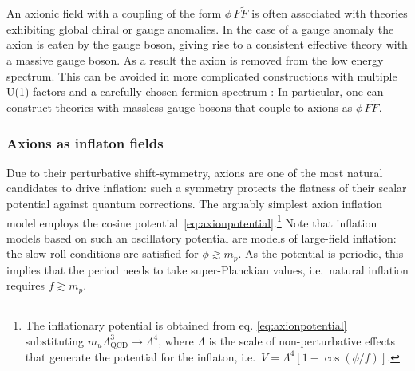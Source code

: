 An axionic field with a coupling of the form $\phi \, F \tilde F$ is often associated with theories exhibiting global chiral or gauge anomalies. In the case of a gauge anomaly the axion is eaten by the gauge boson, giving rise to a consistent effective theory with a massive gauge boson. As a result the axion is removed from the low energy spectrum. This can be avoided in more complicated constructions with multiple U(1) factors and a carefully chosen fermion spectrum \cite{0605225}: In particular, one can construct theories with massless gauge bosons that couple to axions as $\phi \, F \tilde F$. 

\subsubsection*{Axions as inflaton fields}

Due to their perturbative shift-symmetry, axions are one of the most natural candidates to drive inflation: such a symmetry protects the flatness of their scalar potential against quantum corrections. The arguably simplest axion inflation model employs the cosine potential~\eqref{eq:axionpotential}.\footnote{The inflationary potential is obtained from eq. \eqref{eq:axionpotential} substituting $m_u \Lambda_{\text{QCD}}^3 \rightarrow \Lambda^4$, where $\Lambda$ is the scale of non-perturbative effects that generate the potential for the inflaton, i.e.~$V = \Lambda^4 \left[1 - \cos\left(\phi/f\right)\right]$.} Note that inflation models based on such an oscillatory potential are models of large-field inflation: the slow-roll conditions are satisfied for $\phi \gtrsim m_p$. As the potential is periodic, this implies that the period needs to take super-Planckian values, i.e.~natural inflation requires $f \gtrsim m_p$. 

